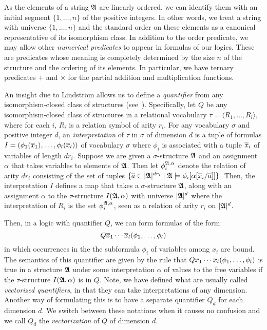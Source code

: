\documentclass[a4paper,UKenglish,cleveref, autoref, thm-restate, anonymous]{lipics-v2021}
\begin{document}
As the elements of a string $\mathfrak{A}$ are linearly ordered, we can identify them with an initial segment $\{1,\ldots,n\}$ of the positive integers.  In other words, we treat a string with universe $\{1,\ldots,n\}$ and the standard order on these elements as a canonical representative of its isomorphism class.  In addition to the order predicate, we may allow other \emph{numerical predicates} to appear in formulas of our logics.  These are predicates whose meaning is completely determined by the size $n$ of the structure and the ordering of its elements.  In particular, we have ternary predicates $+$ and $\times$ for the partial addition and multiplication functions.

An insight due to Lindstr\"om allows us to define a \emph{quantifier} from any isomorphism-closed class of structures (see~\cite{Ebb85}).  Specifically, let $Q$ be any isomorphism-closed class of structures in a relational vocabulary $\tau = \langle R_1,\ldots,R_l\rangle$, where for each $i$, $R_i$ is a relation symbol of arity $r_i$.  For any vocabulary $\sigma$ and positive integer $d$, an \emph{interpretation} of $\tau$ in $\sigma$ of dimension $d$ is a tuple of formulas $I = (\phi_1(\overline{x}_1),\dots, \phi_l(\overline{x}_l))$ of vocabulary $\sigma$ where $\phi_i$ is associated with a tuple $\overline{x}_i$ of variables of length $dr_i$.  Suppose we are given a $\sigma$-structure $\mathfrak{A}$ and an assignment $\alpha$ that takes variables to elements of $\mathfrak{A}$.  Then let $\phi_i^{\mathfrak{A},\alpha}$ denote the relation of arity $dr_i$ consisting of the set of tuples $\{\overline{a} \in |\mathfrak{A}|^{dr_i} \mid \mathfrak{A} \models \phi_i[\alpha[\overline{x}_i/\overline{a}]] \}$.  Then, the interpretation $I$ defines a map that takes a $\sigma$-structure $\mathfrak{A}$, along with an assignment $\alpha$ to the  $\tau$-structure $I(\mathfrak{A},\alpha)$ with universe $|\mathfrak{A}|^d$ where the interpretation of $R_i$ is the set $\phi_i^{\mathfrak{A},\alpha}$, seen as a relation of arity $r_i$ on $|\mathfrak{A}|^d$.

Then, in a logic with quantifier $Q$, we can form formulas of the form
$$Q \overline{x}_1\cdots \overline{x}_l (\phi_1,\ldots,\phi_l)$$
in which occurrences in the the subformula $\phi_i$  of variables among $x_i$ are bound.  The semantics of this quantifier are given by the rule that 
$Q \overline{x}_1\cdots \overline{x}_l (\phi_1,\ldots,\phi_l)$ is true in a structure $\mathfrak{A}$ under some interpretation $\alpha$ of values to the free variables if the $\tau$-structure $I(\mathfrak{A},\alpha)$ is in $Q$.  Note, we have defined what are usually called \emph{vectorized quantifiers}, in that they can take interpretations of any dimension.  Another way of formulating this is to have a separate quantifier $Q_d$ for each dimension $d$.  We switch between these notations when it causes no confusion and we call $Q_d$ the \emph{vectorization} of $Q$ of dimension $d$.
\end{document}
